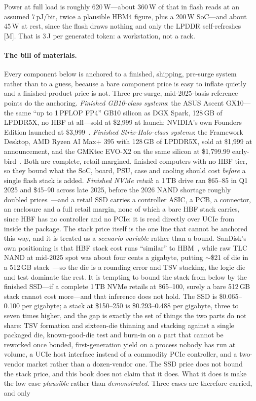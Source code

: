 Power at full load is roughly 620\,W---about 360\,W of that in flash reads at an assumed 7\,pJ/bit, twice a plausible HBM4 figure, plus a 200\,W SoC---and about 45\,W at rest, since the flash draws nothing and only the LPDDR self-refreshes [M]. That is 3\,J per generated token: a workstation, not a rack.

\paragraph{The bill of materials.} Every component below is anchored to a finished, shipping, pre-surge system rather than to a guess, because a bare component price is easy to inflate quietly and a finished-product price is not. Three pre-surge, mid-2025-basis reference points do the anchoring. \emph{Finished GB10-class systems}: the ASUS Ascent GX10---the same ``up to 1\,PFLOP FP4'' GB10 silicon as DGX Spark, 128\,GB of LPDDR5X, no HBF at all---sold at \$2,999 at launch; NVIDIA's own Founders Edition launched at \$3,999~\cite{dgx-spark-price}. \emph{Finished Strix-Halo-class systems}: the Framework Desktop, AMD Ryzen AI Max+ 395 with 128\,GB of LPDDR5X, sold at \$1,999 at announcement, and the GMKtec EVO-X2 on the same silicon at \$1,799.99 early-bird~\cite{framework-desktop}. Both are complete, retail-margined, finished computers with no HBF tier, so they bound what the SoC, board, PSU, case and cooling should cost \emph{before} a single flash stack is added. \emph{Finished NVMe retail}: a 1\,TB drive ran \$65--85 in Q1 2025 and \$45--90 across late 2025, before the 2026 NAND shortage roughly doubled prices~\cite{nvme-presurge}---and a retail SSD carries a controller ASIC, a PCB, a connector, an enclosure and a full retail margin, none of which a bare HBF stack carries, since HBF has no controller and no PCIe: it is read directly over UCIe from inside the package. The stack price itself is the one line that cannot be anchored this way, and it is treated as a \emph{scenario variable} rather than a bound. SanDisk's own positioning is that HBF stack cost runs ``similar'' to HBM~\cite{sandisk-hbf-facts}, while raw TLC NAND at mid-2025 spot was about four cents a gigabyte, putting $\sim$\$21 of die in a 512\,GB stack~\cite{nand-spot}---so the die is a rounding error and TSV stacking, the logic die and test dominate the rest. It is tempting to bound the stack from below by the finished SSD---if a complete 1\,TB NVMe retails at \$65--100, surely a bare 512\,GB stack cannot cost more---and that inference does not hold. The SSD is \$0.065--0.100 per gigabyte; a stack at \$150--250 is \$0.293--0.488 per gigabyte, three to seven times higher, and the gap is exactly the set of things the two parts do not share: TSV formation and sixteen-die thinning and stacking against a single packaged die, known-good-die test and burn-in on a part that cannot be reworked once bonded, first-generation yield on a process nobody has run at volume, a UCIe host interface instead of a commodity PCIe controller, and a two-vendor market rather than a dozen-vendor one. The SSD price does not bound the stack price, and this book does not claim that it does. What it does is make the low case \emph{plausible} rather than \emph{demonstrated}. Three cases are therefore carried, and only 